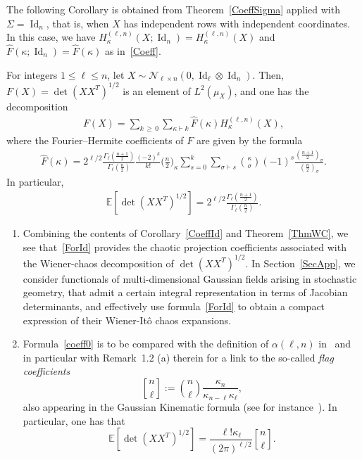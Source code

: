 \documentclass[AHL,Unicode,longabstracts,published]{cedram}
\DeclareMathOperator{\Id}{Id}
\newcommand{\scN}{\mathscr{N}}
\newcommand{\E}[1]{\mathbb{E}\left[#1\right]}
\newcommand*{\alphenumi}{\renewcommand*{\theenumi}{\alph{enumi}}}
\newcommand*{\kbinom}[2]{\genfrac{[}{]}{0pt}{}{#1}{#2}}
\begin{document}
The following Corollary is obtained from Theorem~\ref{CoeffSigma} applied with $\Sigma=\Id_{n}$, that is, when $X$ has independent rows with independent coordinates. In this case, we have $H_{\kappa}^{(\ell,n)}(X;\Id_n)=H_{\kappa}^{(\ell,n)}(X)$ and $\widehat{F}(\kappa;\Id_n)=\widehat{F}(\kappa)$ as in~\eqref{Coeff}.
\begin{coro}\label{CoeffId}
For integers $1\leq \ell \leq n$, let $X \sim \scN_{\ell \times n}(0,\Id_{\ell}\otimes \Id_n)$. Then, $F(X)=\det(XX^T)^{1/2}$ is an element of $L^2(\mu_X)$, and one has the decomposition
\begin{gather*}
F(X)= \sum_{k\,\geq\,0} \sum_{\kappa\vdash k} \widehat{F}(\kappa) H_{\kappa}^{(\ell,n)}(X),
\end{gather*}
where the Fourier--Hermite coefficients of $F$ are given by the formula
\begin{gather}\label{ForId}
\widehat{F}(\kappa) = 2^{\ell/2} \frac{\Gamma_{\ell}\left(\frac{n+1}{2}\right)}{\Gamma_{\ell}\left(\frac{n}{2}\right)} \frac{ (-2)^{k} }{ k!}\bigg(\frac{n}{2}\bigg)_{\kappa}
\sum_{s=0}^{k} \sum_{\sigma\vdash s} \binom{\kappa}{\sigma} (-1)^s\frac{\left(\frac{n+1}{2}\right)_{\sigma}}{\left(\frac{n}{2}\right)_{\sigma}}.
\end{gather}
In particular,
\begin{gather}\label{coeff0}
\E{\det\left(XX^T\right)^{1/2}}= 2^{\ell/2}\frac{\Gamma_{\ell}\left(\frac{n+1}{2}\right)}{\Gamma_{\ell}\left(\frac{n}{2}\right)}.
\end{gather}
\end{coro}

\begin{rema}\leavevmode
\begin{enumerate}\alphenumi
\item Combining the contents of Corollary~\ref{CoeffId} and Theorem~\ref{ThmWC}, we see that~\eqref{ForId} provides the chaotic projection coefficients associated with the Wiener-chaos decomposition of $\det(XX^T)^{1/2}$. In Section~\ref{SecApp}, we consider functionals of multi-dimensional Gaussian fields arising in stochastic geometry, that admit a certain integral representation in terms of Jacobian determinants, and effectively use formula~\eqref{ForId} to obtain a compact expression of their Wiener-Itô chaos expansions.
\item Formula~\eqref{coeff0} is to be compared with the definition of $\alpha(\ell,n)$ in~\cite[Eq.~(1.8)]{Not20} and in particular with Remark~1.2 (a) therein for a link to the so-called \emph{flag coefficients}
\[
\kbinom{ n}{\ell}:=\binom{n}{\ell} \frac{\kappa_{n}}{\kappa_{n-\ell}\kappa_{\ell}},
\]
also appearing in the Gaussian Kinematic formula (see for instance~\cite[Chapter~13]{AT09}). In particular, one has that
\[
\E{\det\left(XX^T\right)^{1/2}} = \frac{\ell! \kappa_{\ell}}{(2\pi)^{\ell/2}} \kbinom{ n}{\ell}.
\]
\end{enumerate}
\end{rema}
\end{document}
